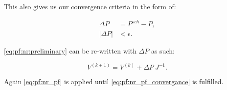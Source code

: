 This also gives us our convergence criteria in the form of:

\begin{equation}
    \begin{split}
        \Delta P &= P^{sch} - P,\\
        |\Delta P| &< \epsilon.
    \end{split}
    \label{eq:pf:nr_pf_convergance}
\end{equation}

\autoref{eq:pf:nr:preliminary} can be re-written with $\Delta P$ as such:

\begin{equation}
    V^{(k+1)} = V^{(k)} + \Delta P \ J^{-1}.
    \label{eq:pf:nr_pf}
\end{equation}

Again \autoref{eq:pf:nr_pf} is applied until
\ref{eq:pf:nr_pf_convergance} is fulfilled.
